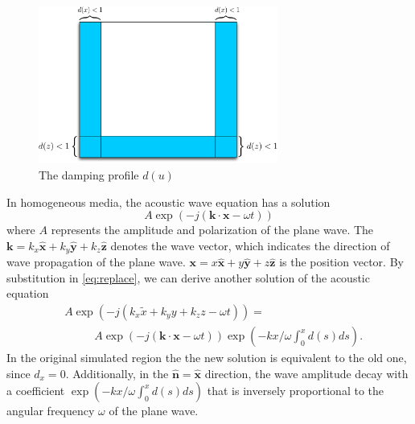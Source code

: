 \documentclass[11pt,titlepage]{article}
\newcommand{\bx}{\boldsymbol{x}}
\newcommand{\bk}{\boldsymbol{k}}
\newcommand{\hx}{\hat{\mathbf{x}}}
\newcommand{\hy}{\hat{\mathbf{y}}}
\newcommand{\hz}{\hat{\mathbf{z}}}
\theoremstyle{plain}
\theoremstyle{definition}
\theoremstyle{remark}
\numberwithin{equation}{section}
\begin{document}
\begin{figure}[htbp]
\centering
\includegraphics[width=0.7\textwidth]{Fig/SpongeABC.pdf}
\caption{The damping profile $d(u)$}
\end{figure}
In homogeneous media, the acoustic wave equation has a solution
 \begin{equation}
 A \exp(-j (\bk \cdot \bx -\omega t))
 \end{equation}
  where $A$ represents the amplitude and polarization of the plane wave. The $\bk = k_x \hx + k_y \hy +k_z \hz$ denotes the wave vector, which indicates the direction of wave propagation of the plane wave. $\bx = x\hx +y\hy +z \hz$ is the position vector. By substitution  in \eqref{eq:replace}, we can derive another solution of the acoustic equation
\begin{equation}
\begin{aligned}
&A\exp(-j(k_x \tilde{x} + k_y y + k_z z -\omega t))=\\
 &~~~~~~~~~~~~A\exp(-j (\bk\cdot \bx -\omega t))\exp(-kx/\omega \int_0^x d(s)ds).
\end{aligned}
\end{equation}
In the original simulated region the the new solution is equivalent to the old one, since $d_x=0$. Additionally, in the $\hat{\mathbf{n}}= \hx$ direction, the wave amplitude decay with a coefficient $\exp(-kx/\omega \int_0^x d(s)ds)$ that is inversely proportional to the angular frequency $\omega$ of the plane wave. 
\end{document}
